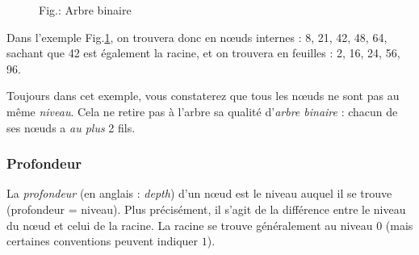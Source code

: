 \documentclass[11pt,a4paper]{article}
\begin{document}
\begin{figure}[ht!]
\caption{Fig.\thefigure : Arbre binaire}
\label{fig:example1-binary-tree-1}
\end{figure}

\vspace*{-0.35cm} %

Dans l'exemple Fig.\ref{fig:example1-binary-tree-1}, on trouvera donc en nœuds internes : 8, 21, 42, 48, 64, sachant que 42 est également la racine, et on trouvera en feuilles : 2, 16, 24, 56, 96.

Toujours dans cet exemple, vous constaterez que tous les nœuds ne sont pas au même \textit{niveau}.
Cela ne retire pas à l'arbre sa qualité d'\textit{arbre binaire} : chacun de ses nœuds a \textit{au plus} 2 fils.

\vspace*{-0.35cm} %

\subsubsection{Profondeur}

La \textit{profondeur} (en anglais : \textit{depth}) d'un nœud est le niveau auquel il se trouve (profondeur = niveau).
Plus précisément, il s'agit de la différence entre le niveau du nœud et celui de la racine. %
La racine se trouve généralement au niveau $ 0 $ (mais certaines conventions peuvent indiquer $ 1 $).
\end{document}

